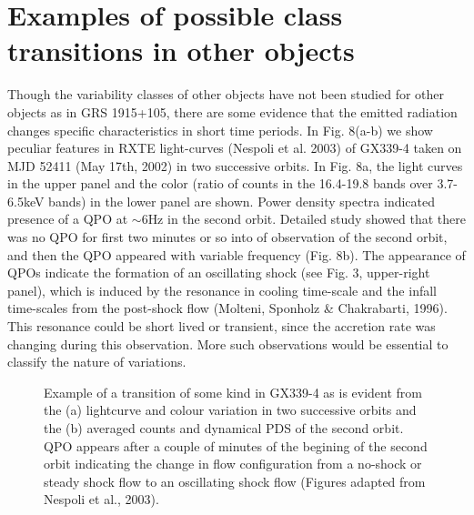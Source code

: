 \documentclass[referee]{cjaa}           %
\begin{document}
\section{Examples of possible class transitions in other objects}

Though the variability classes of other objects have not been studied 
for other objects as in GRS 1915+105, there are some evidence that the emitted
radiation changes specific characteristics in short time periods. In Fig. 8(a-b) 
we show peculiar features in RXTE light-curves (Nespoli et al. 2003) of  GX339-4 taken on MJD 52411 (May 17th, 2002)
in two successive orbits. In Fig. 8a, the light curves in the upper panel and the color (ratio of counts
in the 16.4-19.8 bands over 3.7-6.5keV bands) in the lower panel are shown. Power density spectra
indicated presence of a QPO at $\sim 6$Hz in the second orbit. Detailed study showed that there was no QPO
for first two minutes or so into of observation of the second orbit, and then the QPO appeared with
variable  frequency (Fig. 8b). The appearance of QPOs indicate the formation of an oscillating shock
(see Fig. 3, upper-right panel),
which is induced by the resonance in cooling time-scale and the infall time-scales from the post-shock flow
(Molteni, Sponholz \& Chakrabarti, 1996).
This resonance could be short lived or transient, since the accretion rate was changing during this observation.
More such observations would be essential to classify the nature of variations.

\begin{figure}
   \begin{center}
\vskip 0.5cm
   \mbox{\textwidth{}\textwidth{}}
   \mbox{\textwidth{}\textwidth{}}
\vskip 0.0cm
   \caption{
Example of a transition of some kind in GX339-4 as is evident from the (a) lightcurve and  colour
variation  in two successive orbits and the (b) averaged counts and  dynamical PDS of the second orbit.
QPO appears after a couple of minutes of the begining of the second orbit indicating the change in flow
configuration from a no-shock or steady shock flow to an oscillating shock flow (Figures adapted from 
Nespoli et al., 2003).} 
   \end{center}
\end{figure}
\end{document}
